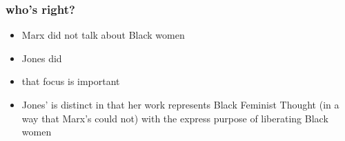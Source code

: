 \documentclass{beamer} %
\theoremstyle{definition} %
\begin{document}
\begin{frame} 
	\frametitle{who's right?}
	\begin{itemize}
		\item Marx did not talk about Black women
		\item Jones did
		\item that focus is important
		\item Jones' is distinct in that her work represents Black Feminist Thought (in a way that Marx's could not) with the express purpose of liberating Black women
	\end{itemize}
\end{frame}

\begin{frame}


\end{frame}
\end{document}
